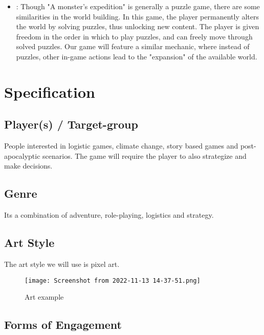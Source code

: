 \documentclass[a4paper]{scrreprt}
\begin{document}
\begin{itemize}
    \item \cite{monstersexpedition}:\newline
    Though "A monster's expedition" is generally a puzzle game, there are some similarities in the world building. In this game, the player permanently alters the world by solving puzzles, thus unlocking new content. The player is given freedom in the order in which to play puzzles, and can freely move through solved puzzles. Our game will feature a similar mechanic, where instead of puzzles, other in-game actions lead to the "expansion" of the available world.
\end{itemize}

\chapter{Specification}

\section{Player(s) / Target-group}
People interested in logistic games, climate change, story based games and post-apocalyptic scenarios.
The game will require the player to also strategize and make decisions.

\section{Genre}
Its a combination of adventure, role-playing, logistics and strategy. 

\section{Art Style}
The art style we will use is pixel art.
\begin{figure}
\centering
\texttt{[image: Screenshot from 2022-11-13 14-37-51.png]}
\caption{\label{fig:art} Art example \citep{artexample}}
\end{figure}

\section{Forms of Engagement}
\end{document}
